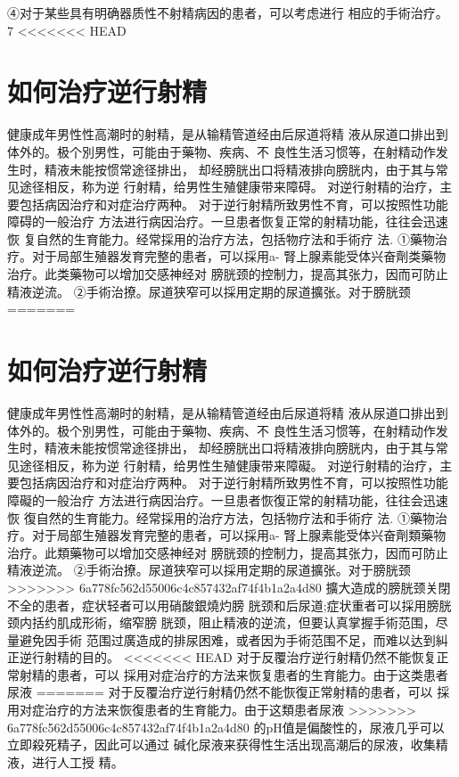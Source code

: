 \documentclass[12pt,UTF8]{ctexbook}
\begin{document}
④对于某些具有明确器质性不射精病因的患者，可以考虑进行
相应的手術治疗。
7
<<<<<<< HEAD
\section{如何治疗逆行射精}
健康成年男性性高潮时的射精，是从输精管道经由后尿道将精
液从尿道口排出到体外的。极个別男性，可能由于藥物、疾病、不
良性生活习惯等，在射精动作发生时，精液未能按惯常途径排出，
却经膀胱出口将精液排向膀胱内，由于其与常见途径相反，称为逆
行射精，给男性生殖健康带来障碍。
对逆行射精的治疗，主要包括病因治疗和对症治疗两种。
对于逆行射精所致男性不育，可以按照性功能障碍的一般治疗
方法进行病因治疗。一旦患者恢复正常的射精功能，往往会迅速恢
复自然的生育能力。经常採用的治疗方法，包括物疗法和手術疗
法.
①藥物治疗。对于局部生殖器发育完整的患者，可以採用a-
腎上腺素能受体兴奋劑类藥物治疗。此类藥物可以增加交感神经对
膀胱颈的控制力，提高其张力，因而可防止精液逆流。
②手術治撩。尿道狭窄可以採用定期的尿道擴张。对于膀胱颈
=======
\section{如何治疗逆行射精}
健康成年男性性高潮时的射精，是从输精管道经由后尿道将精
液从尿道口排出到体外的。极个別男性，可能由于藥物、疾病、不
良性生活习惯等，在射精动作发生时，精液未能按惯常途径排出，
却经膀胱出口将精液排向膀胱内，由于其与常见途径相反，称为逆
行射精，给男性生殖健康带来障礙。
对逆行射精的治疗，主要包括病因治疗和对症治疗两种。
对于逆行射精所致男性不育，可以按照性功能障礙的一般治疗
方法进行病因治疗。一旦患者恢復正常的射精功能，往往会迅速恢
復自然的生育能力。经常採用的治疗方法，包括物疗法和手術疗
法.
①藥物治疗。对于局部生殖器发育完整的患者，可以採用a-
腎上腺素能受体兴奋劑類藥物治疗。此類藥物可以增加交感神经对
膀胱颈的控制力，提高其张力，因而可防止精液逆流。
②手術治撩。尿道狭窄可以採用定期的尿道擴张。对于膀胱颈
>>>>>>> 6a778fc562d55006c4c857432af74f4b1a2a4d80
擴大造成的膀胱颈关閉不全的患者，症状轻者可以用硝酸銀燒灼膀
胱颈和后尿道;症状重者可以採用膀胱颈内括约肌成形術，缩窄膀
胱颈，阻止精液的逆流，但要认真掌握手術范围，尽量避免因手術
范围过廣造成的排尿困难，或者因为手術范围不足，而难以达到糾
正逆行射精的目的。
<<<<<<< HEAD
对于反覆治疗逆行射精仍然不能恢复正常射精的患者，可以
採用对症治疗的方法来恢复患者的生育能力。由于这类患者尿液
=======
对于反覆治疗逆行射精仍然不能恢復正常射精的患者，可以
採用对症治疗的方法来恢復患者的生育能力。由于这類患者尿液
>>>>>>> 6a778fc562d55006c4c857432af74f4b1a2a4d80
的pH值是偏酸性的，尿液几乎可以立即殺死精子，因此可以通过
碱化尿液来获得性生活出现高潮后的尿液，收集精液，进行人工授
精。
\end{document}
